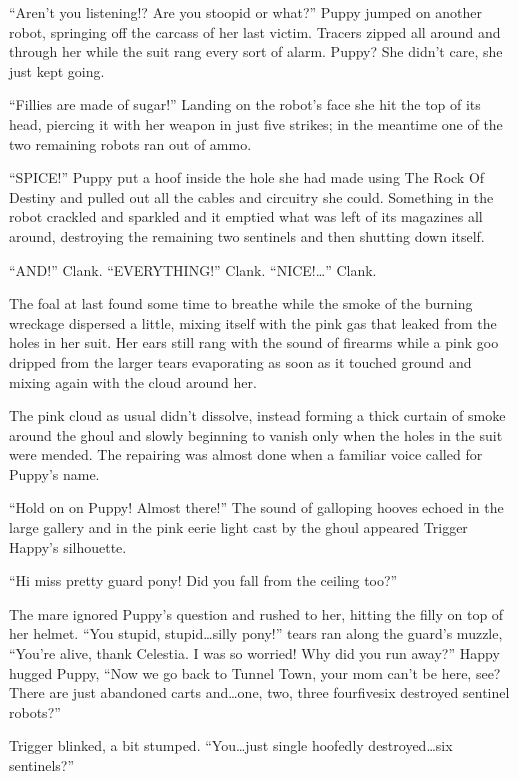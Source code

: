 ``Aren't you listening!? Are you stoopid or what?'' Puppy jumped on another robot, springing off the carcass of her last victim. Tracers zipped all around and through her while the suit rang every sort of alarm. Puppy? She didn't care, she just kept going.

``Fillies are made of sugar!'' Landing on the robot's face she hit the top of its head, piercing it with her weapon in just five strikes; in the meantime one of the two remaining robots ran out of ammo.

``SPICE!'' Puppy put a hoof inside the hole she had made using The Rock Of Destiny and pulled out all the cables and circuitry she could. Something in the robot crackled and sparkled and it emptied what was left of its magazines all around, destroying the remaining two sentinels and then shutting down itself.

``AND!'' Clank. ``EVERYTHING!'' Clank. ``NICE!\dots'' Clank.

The foal at last found some time to breathe while the smoke of the burning wreckage dispersed a little, mixing itself with the pink gas that leaked from the holes in her suit. Her ears still rang with the sound of firearms while a pink goo dripped from the larger tears evaporating as soon as it touched ground and mixing again with the cloud around her.

The pink cloud as usual didn't dissolve, instead forming a thick curtain of smoke around the ghoul and slowly beginning to vanish only when the holes in the suit were mended. The repairing was almost done when a familiar voice called for Puppy's name.

``Hold on on Puppy! Almost there!'' The sound of galloping hooves echoed in the large gallery and in the pink eerie light cast by the ghoul appeared Trigger Happy's silhouette.

``Hi miss pretty guard pony! Did you fall from the ceiling too?''

The mare ignored Puppy's question and rushed to her, hitting the filly on top of her helmet. ``You stupid, stupid\dots silly pony!'' tears ran along the guard's muzzle, ``You're alive, thank Celestia. I was so worried! Why did you run away?'' Happy hugged Puppy, ``Now we go back to Tunnel Town, your mom can't be here, see? There are just abandoned carts and\dots one, two, three fourfivesix destroyed sentinel robots?''

Trigger blinked, a bit stumped. ``You\dots just single hoofedly destroyed\dots six sentinels?''

